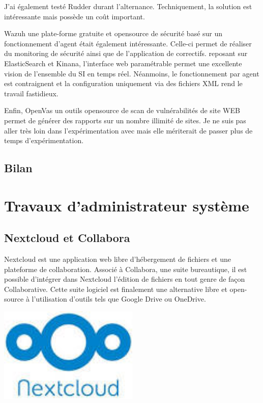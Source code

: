 \documentclass[12pt]{article}
\begin{document}
J'ai également testé Rudder durant l'alternance. 
Techniquement, la solution est intéressante mais possède un coût important.

Wazuh une plate-forme gratuite et opensource de sécurité basé sur un fonctionnement d'agent était également intéressante. 
Celle-ci permet de réaliser du monitoring de sécurité ainsi que de l'application de correctifs. reposant sur ElasticSearch et Kinana, l'interface web paramétrable permet une excellente vision de l'ensemble du SI en temps réel. 
Néanmoins, le fonctionnement par agent est contraignent et la configuration uniquement via des fichiers XML rend le travail fastidieux.

Enfin, OpenVas un outils opensource de scan de vulnérabilités de site WEB permet de générer des rapports sur un nombre illimité de sites. 
Je ne suis pas aller très loin dans l'expérimentation avec mais elle mériterait de passer plus de temps d'expérimentation.

\newpage
\subsection{Bilan}


\newpage
\section{Travaux d'administrateur système}
\subsection{Nextcloud et Collabora}
\noindent%
\begin{minipage}{.7\textwidth}%
Nextcloud est une application web libre d'hébergement de fichiers et une plateforme de collaboration. 
Associé à Collabora, une suite bureautique, il est possible d'intégrer dans Nextcloud l'édition de fichiers en tout genre de façon Collaborative. 
Cette suite logiciel est finalement une alternative libre et open-source à l'utilisation d'outils tels que Google Drive ou OneDrive.
\end{minipage}%
\hfill
\begin{minipage}{.3\textwidth}%
\begin{center}
\includegraphics[width=0.5\textwidth]{src/nextcloud.jpeg}
\end{center}
\end{minipage}%
\end{document}
